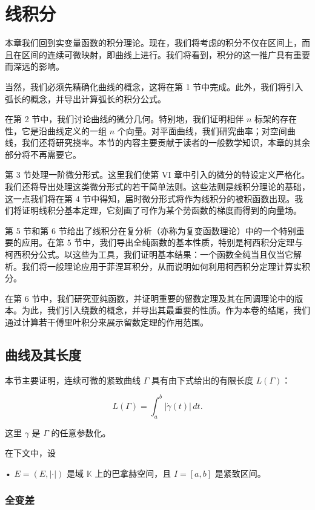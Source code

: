 \chapter{线积分}
本章我们回到实变量函数的积分理论。现在，我们将考虑的积分不仅在区间上，而且在区间的连续可微映射，即曲线上进行。我们将看到，积分的这一推广具有重要而深远的影响。

当然，我们必须先精确化曲线的概念，这将在第 1 节中完成。此外，我们将引入弧长的概念，并导出计算弧长的积分公式。

在第 2 节中，我们讨论曲线的微分几何。特别地，我们证明相伴 $ n $ 标架的存在性，它是沿曲线定义的一组 $ n $ 个向量。对平面曲线，我们研究曲率；对空间曲线，我们还将研究挠率。本节的内容主要贡献于读者的一般数学知识，本章的其余部分将不再需要它。

第 3 节处理一阶微分形式。这里我们使第 VI 章中引入的微分的特设定义严格化。我们还将导出处理这类微分形式的若干简单法则。这些法则是线积分理论的基础，这一点我们将在第 4 节中得知，届时微分形式将作为线积分的被积函数出现。我们将证明线积分基本定理，它刻画了可作为某个势函数的梯度而得到的向量场。

第 5 节和第 6 节给出了线积分在复分析（亦称为复变函数理论）中的一个特别重要的应用。在第 5 节中，我们导出全纯函数的基本性质，特别是柯西积分定理与柯西积分公式。以这些为工具，我们证明基本结果：一个函数全纯当且仅当它解析。我们将一般理论应用于菲涅耳积分，从而说明如何利用柯西积分定理计算实积分。

在第 6 节中，我们研究亚纯函数，并证明重要的留数定理及其在同调理论中的版本。为此，我们引入绕数的概念，并导出其最重要的性质。作为本卷的结尾，我们通过计算若干傅里叶积分来展示留数定理的作用范围。

\section{曲线及其长度}

本节主要证明，连续可微的紧致曲线 $ \Gamma $ 具有由下式给出的有限长度 $ L(\Gamma) $：

\[
L(\Gamma) = \int_a^b |\dot{\gamma}(t)|\,dt .
\]

这里 $ \gamma $ 是 $ \Gamma $ 的任意参数化。

在下文中，设

• $ E = (E,|\cdot|) $ 是域 $ \mathbb{K} $ 上的巴拿赫空间，且 $ I = [a,b] $ 是紧致区间。

\subsection*{全变差}

